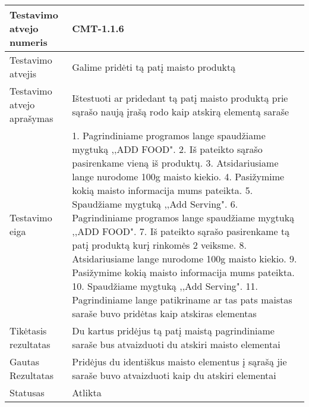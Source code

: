 \documentclass[oneside]{VUMIFPSkursinis}
\begin{document}
\begin{center}
    \begin{tabular}{ |p{5cm}|p{13cm}|}
    \hline
        Testavimo atvejo numeris &  CMT-1.1.6\\ \hline
        Testavimo atvejis & Galime pridėti tą patį maisto produktą  \\ \hline
        Testavimo atvejo aprašymas & Ištestuoti ar pridedant tą patį maisto produktą prie sąrašo naują įrašą rodo kaip atskirą elementą saraše  \\ \hline
        Testavimo eiga &  1. Pagrindiniame programos lange spaudžiame mygtuką ,,ADD FOOD". 
				2. Iš pateikto sąrašo pasirenkame vieną iš produktų. 
				3. Atsidariusiame lange nurodome 100g maisto kiekio.
				4. Pasižymime kokią maisto informacija mums pateikta. 
				5. Spaudžiame mygtuką ,,Add Serving".
				6. Pagrindiniame programos lange spaudžiame mygtuką ,,ADD FOOD".
				7. Iš pateikto sąrašo pasirenkame tą patį produktą kurį rinkomės 2 veiksme.
				8. Atsidariusiame lange nurodome 100g maisto kiekio.
				9. Pasižymime kokią maisto informacija mums pateikta.
				10. Spaudžiame mygtuką ,,Add Serving".
				11. Pagrindiniame lange patikriname ar tas pats maistas saraše buvo pridėtas kaip atskiras elementas \\ \hline
        Tikėtasis rezultatas &  Du kartus pridėjus tą patį maistą pagrindiniame saraše bus atvaizduoti du atskiri maisto elementai\\ \hline
        Gautas Rezultatas &  Pridėjus du identiškus maisto elementus į sąrašą jie saraše buvo atvaizduoti kaip du atskiri elementai\\ \hline
        Statusas & Atlikta \\ \hline
    \hline
    \end{tabular}
\end{center}
\end{document}
